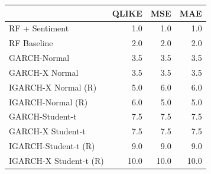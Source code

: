 \begin{table}[htbp]
\centering
\begin{tabular}{lrrr}
\toprule
 & QLIKE & MSE & MAE \\
\midrule
RF + Sentiment & 1.0 & 1.0 & 1.0 \\
RF Baseline & 2.0 & 2.0 & 2.0 \\
GARCH-Normal & 3.5 & 3.5 & 3.5 \\
GARCH-X Normal & 3.5 & 3.5 & 3.5 \\
IGARCH-X Normal (R) & 5.0 & 6.0 & 6.0 \\
IGARCH-Normal (R) & 6.0 & 5.0 & 5.0 \\
GARCH-Student-t & 7.5 & 7.5 & 7.5 \\
GARCH-X Student-t & 7.5 & 7.5 & 7.5 \\
IGARCH-Student-t (R) & 9.0 & 9.0 & 9.0 \\
IGARCH-X Student-t (R) & 10.0 & 10.0 & 10.0 \\
\bottomrule
\end{tabular}
\label{tab:forecast_loss_ranking}
\end{table}

